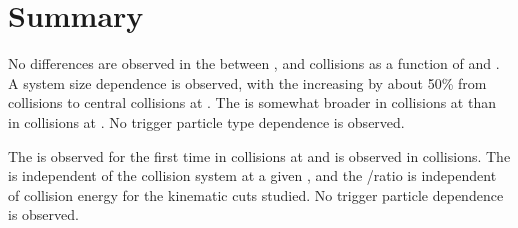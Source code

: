 \section{Summary}
No differences are observed in the \jlc between \dAu, \Cu and \Au collisions as a function of \pttrig and \ptassoc.  A system size dependence is observed, with the \jlc increasing by about 50\% from \dAu collisions to central \Au collisions at \sNNtwohundred.  The \jlc is somewhat broader in \Au collisions at \sNNtwohundred than in \Cu collisions at \sNNtwohundred.  No trigger particle type dependence is observed.

The \ridge is observed for the first time in collisions at \sNNsixtytwo and is observed in \Cu collisions.  The \ridge is independent of the collision system at a given \npart, and the \nridge/\njet ratio is independent of collision energy for the kinematic cuts studied.  No trigger particle dependence is observed.